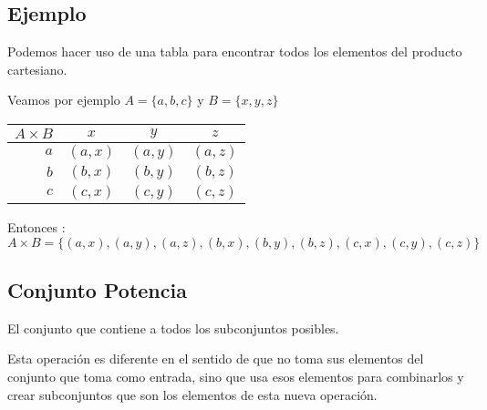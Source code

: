 \documentclass[12pt]{report}                                    %
\begin{document}
                \clearpage
                \subsection*{Ejemplo}

                    Podemos hacer uso de una tabla para encontrar todos los elementos del producto
                    cartesiano.

                    Veamos por ejemplo $A = \{a, b, c\}$ y $B = \{ x, y, z\}$

                    \begin{tabular}{r ||c |c | c  }
                       $A \times B$ & $x$ & $y$ & $z$ \\
                       \midrule
                      
                       $a$ &  $(a, x)$  &  $(a, y)$  &  $(a, z)$  \\
                       $b$ &  $(b, x)$  &  $(b, y)$  &  $(b, z)$  \\
                       $c$ &  $(c, x)$  &  $(c, y)$  &  $(c, z)$  \\
                     
                    \end{tabular}

                    Entonces : 
                    \begin{equation*}
                        A \times B = 
                        \{
                            (a, x) , (a, y) , (a, z) ,
                            (b, x) , (b, y) , (b, z) ,
                            (c, x) , (c, y) , (c, z) 
                        \}
                    \end{equation*}



            \clearpage
            \subsection{Conjunto Potencia}

                El conjunto que contiene a todos los subconjuntos posibles. 

                Esta operación es diferente en el sentido de que no toma sus elementos del conjunto
                que toma como entrada, sino que usa esos elementos para combinarlos y crear subconjuntos
                que son los elementos de esta nueva operación.
\end{document}
